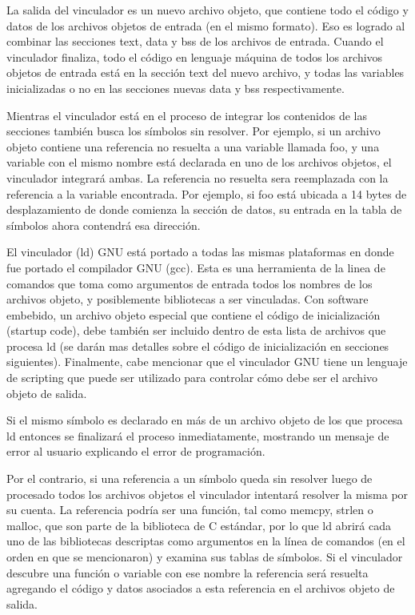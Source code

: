 \documentclass[output=paper, 
colorlinks,
citecolor=brown,
newtxmath
]{langscibook}
\begin{document}
La salida del vinculador es un nuevo archivo objeto, que contiene todo el código y datos
de los archivos objetos de entrada (en el mismo formato).
Eso es logrado al combinar las secciones text, data y bss de los archivos de entrada.
Cuando el vinculador finaliza, todo el código en lenguaje máquina de todos los archivos
objetos de entrada está en la sección text del nuevo archivo, y todas las variables
inicializadas o no en las secciones nuevas data y bss respectivamente.

Mientras el vinculador está en el proceso de integrar 
los contenidos de las secciones también 
busca los símbolos sin resolver. Por ejemplo, si un archivo objeto contiene 
una referencia no resuelta a  una variable llamada foo, y una variable con 
el mismo nombre está declarada en uno de los archivos objetos, el vinculador
integrará ambas. La referencia no resuelta sera reemplazada con la referencia
a la variable encontrada. Por ejemplo, si foo está ubicada a 14 bytes de desplazamiento
de donde comienza la sección de datos, su entrada en la tabla de símbolos ahora
contendrá esa dirección.

El vinculador (ld) GNU está portado a todas las mismas plataformas en donde
fue portado el compilador GNU (gcc). Esta es una herramienta de la linea de comandos
que toma como argumentos de entrada todos los nombres de los archivos objeto, 
y posiblemente bibliotecas a ser vinculadas.
Con software embebido, un archivo objeto especial que contiene el código de 
inicialización (startup code), debe también ser incluido dentro de esta
lista de archivos que procesa ld (se darán mas detalles sobre el código
de inicialización en secciones siguientes). Finalmente, cabe mencionar
que el vinculador GNU tiene un lenguaje de scripting que puede ser utilizado
para controlar cómo debe ser el archivo objeto de salida.

Si el mismo símbolo es declarado en más de un archivo objeto de los que 
procesa ld entonces se finalizará el proceso inmediatamente, mostrando un mensaje
de error al usuario explicando el error de programación.

Por el contrario, si una referencia a un símbolo queda sin resolver luego de
procesado todos los archivos objetos el vinculador intentará resolver la misma
por su cuenta.
La referencia podría ser una función, tal como memcpy, strlen o malloc, que son
parte de la biblioteca de C estándar, por lo que ld abrirá cada uno de las
bibliotecas descriptas como argumentos en la línea de comandos (en el orden
en que se mencionaron) y examina sus tablas de símbolos. 
Si el vinculador descubre una función o variable con ese nombre la referencia
será resuelta agregando el código y datos asociados a esta referencia en el 
archivos objeto de salida.
\end{document}
